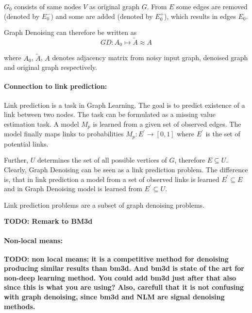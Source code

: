 $G_0$ consists of same nodes $V$ as original graph $G$. 
From $E$ some edges are removed (denoted by $E^{-}_0$) and some are added
(denoted by $E^{+}_0$), which results in edges $E_0$.

Graph Denoising can therefore be written as 
\begin{equation}
    GD: A_0 \mapsto \tilde{A} \approx A
\end{equation}

where $A_0$, $\tilde{A}$, $A$ denotes adjacency matrix from noisy input graph, denoised graph and original graph respectively.


\paragraph{Connection to link prediction:}
Link prediction is a task in Graph Learning. 
The goal is to predict existence of a link between two nodes.
The task can be formulated as a missing value estimation task. A model $M_p$ is learned
from a given set of observed edges. The model finally maps links to probabilities
$M_p : E^{\prime} \rightarrow [0,1]$ where $E^{\prime}$ is the set of potential links.

Further, $U$ determines the set of all possible vertices of $G$, therefore $E \subseteq U$.
Clearly, Graph Denoising can be seen as a link prediction problem.
The difference is, that in link prediction a model from a set of observed links is learned
$E^{\prime} \subseteq E$ and in Graph Denoising model is learned from 
$E^{\prime} \subseteq U$. 

\begin{tcolorbox}[colback=red!5!white,colframe=red!75!black]
    Link prediction problems are a subset of graph denoising problems.
\end{tcolorbox}

\textbf{TODO: Remark to BM3d}

\paragraph{Non-local means:}

\textbf{TODO: 
non local means: it is a competitive method for denoising producing similar results than bm3d. 
And bm3d is state of the art for non-deep learning method. 
You could add bm3d just after that also since this is what you are using? 
Also, carefull that it is not confusing with graph denoising, since bm3d and NLM are signal denoising methods.}


